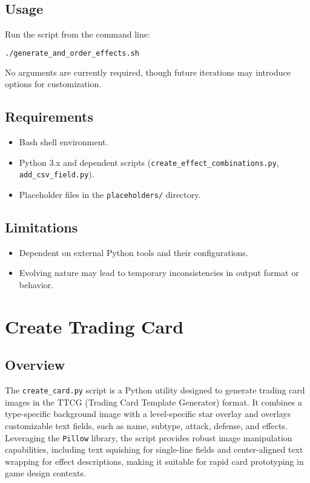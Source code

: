 \subsection{Usage}
Run the script from the command line:
\begin{lstlisting}[language=bash]
./generate_and_order_effects.sh
\end{lstlisting}
No arguments are currently required, though future iterations may introduce options for customization.

\subsection{Requirements}
\begin{itemize}
    \item Bash shell environment.
    \item Python 3.x and dependent scripts (\texttt{create\_effect\_combinations.py}, \texttt{add\_csv\_field.py}).
    \item Placeholder files in the \texttt{placeholders/} directory.
\end{itemize}

\subsection{Limitations}
\begin{itemize}
    \item Dependent on external Python tools and their configurations.
    \item Evolving nature may lead to temporary inconsistencies in output format or behavior.
\end{itemize}











\section{Create Trading Card}
\subsection{Overview}
The \texttt{create\_card.py} script is a Python utility designed to generate trading card images in the TTCG (Trading Card Template Generator) format. It combines a type-specific background image with a level-specific star overlay and overlays customizable text fields, such as name, subtype, attack, defense, and effects. Leveraging the \texttt{Pillow} library, the script provides robust image manipulation capabilities, including text squishing for single-line fields and center-aligned text wrapping for effect descriptions, making it suitable for rapid card prototyping in game design contexts.

